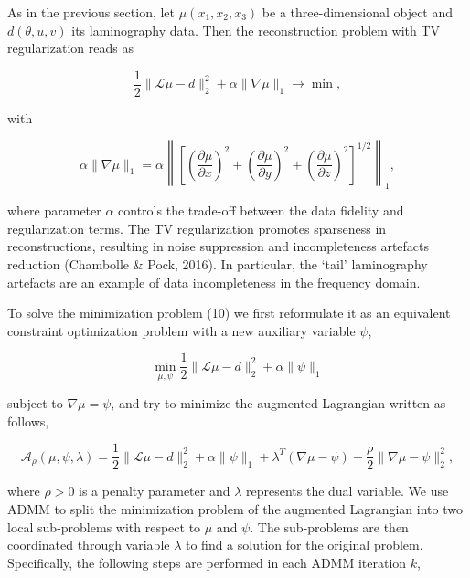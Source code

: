 \documentclass{article}
\begin{document}
As in the previous section, let $\mu(x_1, x_2, x_3)$ be a three-dimensional object and $d(\theta, u, v)$ its laminography data. Then the reconstruction problem with TV regularization reads as

\begin{equation}
\frac{1}{2} \|\mathcal{L}\mu - d\|_2^2 + \alpha \|\nabla\mu\|_1 \rightarrow \min,
\tag{10}
\end{equation}

with

\begin{equation}
\alpha \|\nabla\mu\|_1 = \alpha \left\| \left[ \left( \frac{\partial\mu}{\partial x} \right)^2 + \left( \frac{\partial\mu}{\partial y} \right)^2 + \left( \frac{\partial\mu}{\partial z} \right)^2 \right]^{1/2} \right\|_1,
\tag{11}
\end{equation}

where parameter $\alpha$ controls the trade-off between the data fidelity and regularization terms. The TV regularization promotes sparseness in reconstructions, resulting in noise suppression and incompleteness artefacts reduction (Chambolle \& Pock, 2016). In particular, the ‘tail’ laminography artefacts are an example of data incompleteness in the frequency domain.

To solve the minimization problem (10) we first reformulate it as an equivalent constraint optimization problem with a new auxiliary variable $\psi$,

\begin{equation}
\min_{\mu, \psi} \frac{1}{2} \|\mathcal{L}\mu - d\|_2^2 + \alpha \|\psi\|_1
\tag{12}
\end{equation}

subject to $\nabla\mu = \psi$, and try to minimize the augmented Lagrangian written as follows,

\begin{equation}
\mathcal{A}_\rho(\mu, \psi, \lambda) = \frac{1}{2} \|\mathcal{L}\mu - d\|_2^2 + \alpha \|\psi\|_1 + \lambda^T (\nabla\mu - \psi) + \frac{\rho}{2} \|\nabla\mu - \psi\|_2^2,
\tag{13}
\end{equation}

where $\rho > 0$ is a penalty parameter and $\lambda$ represents the dual variable. We use ADMM to split the minimization problem of the augmented Lagrangian into two local sub-problems with respect to $\mu$ and $\psi$. The sub-problems are then coordinated through variable $\lambda$ to find a solution for the original problem. Specifically, the following steps are performed in each ADMM iteration $k$,
\end{document}

